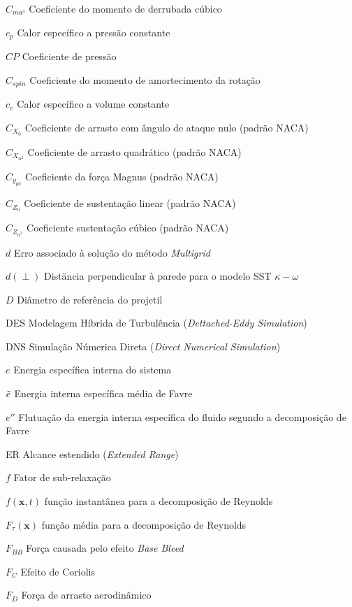 \begin{siglas}
    \item[$C_{ma^3}$] Coeficiente do momento de derrubada cúbico
    \item[$c_p$] Calor específico a pressão constante
    \item[$CP$] Coeficiente de pressão
    \item[$C_{spin}$] Coeficiente do momento de amortecimento da rotação
    \item[$c_v$] Calor específico a volume constante
    \item[$C_{X_0}$] Coeficiente de arrasto com ângulo de ataque nulo (padrão NACA)
    \item[$C_{X_{\alpha^2}}$] Coeficiente de arrasto quadrático (padrão NACA)
    \item[$C_{y_{pa}}$] Coeficiente da força Magnus (padrão NACA)
    \item[$C_{Z_0}$] Coeficiente de sustentação linear (padrão NACA)
    \item[$C_{Z_{\alpha^3}}$] Coeficiente sustentação cúbico (padrão NACA)
    \item[$d$] Erro associado à solução do método \textit{Multigrid}
    \item[$d(\perp)$] Distäncia perpendicular à parede para o modelo SST $\kappa-\omega$
    \item[$D$] Diâmetro de referência do projetil
    \item[DES] Modelagem Híbrida de Turbulência (\textit{Dettached-Eddy Simulation})
    \item[DNS] Simulação Númerica Direta (\textit{Direct Numerical Simulation})
    \item[$e$] Energia específica interna do sistema
    \item[$\Tilde{e}$] Energia interna específica média de Favre
    \item[$e''$] Flutuação da energia interna específica do fluido segundo a decomposição de Favre
    \item[ER] Alcance estendido (\textit{Extended Range})
    \item[$f$] Fator de sub-relaxação
    \item[$f(\textbf{x},t)$] função instantânea para a decomposição de Reynolds
    \item[$F_{\tau}(\textbf{x})$] função média para a decomposição de Reynolds
    \item[$F_{BB}$] Força causada pelo efeito \textit{Base Bleed}
    \item[$F_{C}$] Efeito de Coriolis
    \item[$F_{D}$] Força de arrasto aerodinâmico

\end{siglas}
